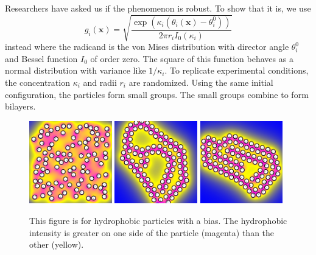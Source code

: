 Researchers have asked us if the phenomenon is robust. To show
that it is, we use 
\begin{equation}
\label{eq:vonMises}
g_i(\mathbf{x}) =
\sqrt{
  \frac{\exp( \kappa_i(\theta_i(\mathbf{x}) - \theta^0_i))}
  {2\pi r_i I_0(\kappa_i)}}
\end{equation}
instead where the radicand is the von Mises 
distribution with director angle $\theta^0_i$ and Bessel function
$I_0$ of order zero. The square of this function behaves as a normal
distribution with variance like $1/\kappa_i$. To replicate
experimental conditions, the concentration $\kappa_i$ and radii
$r_i$ are randomized. Using the same initial configuration, the
particles form small groups. The small groups combine to form bilayers.


\begin{figure}[h!]
  \begin{center}
    \includegraphics[width=0.32\textwidth]{figures/SpecificAim1/N100C1.pdf}
    \includegraphics[width=0.32\textwidth]{figures/SpecificAim1/N100C2.pdf}
    \includegraphics[width=0.32\textwidth]{figures/SpecificAim1/N100C3.pdf}\\
    \caption{This figure is for hydrophobic particles with a bias. The
      hydrophobic intensity is greater on one side of the particle (magenta)
      than the other (yellow).
    \label{fig:self-assemblyC}}
\end{center}
\end{figure}

